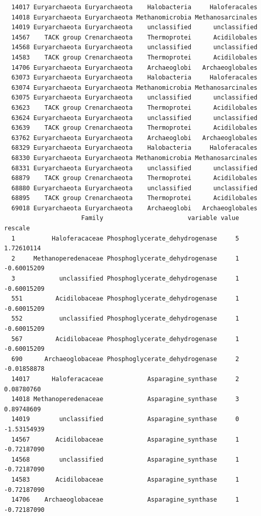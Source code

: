 \documentclass[12pt,twoside]{reedthesis}
\begin{document}
\begin{verbatim}
  14017 Euryarchaeota Euryarchaeota    Halobacteria     Haloferacales
  14018 Euryarchaeota Euryarchaeota Methanomicrobia Methanosarcinales
  14019 Euryarchaeota Euryarchaeota    unclassified      unclassified
  14567    TACK group Crenarchaeota    Thermoprotei      Acidilobales
  14568 Euryarchaeota Euryarchaeota    unclassified      unclassified
  14583    TACK group Crenarchaeota    Thermoprotei      Acidilobales
  14706 Euryarchaeota Euryarchaeota    Archaeoglobi   Archaeoglobales
  63073 Euryarchaeota Euryarchaeota    Halobacteria     Haloferacales
  63074 Euryarchaeota Euryarchaeota Methanomicrobia Methanosarcinales
  63075 Euryarchaeota Euryarchaeota    unclassified      unclassified
  63623    TACK group Crenarchaeota    Thermoprotei      Acidilobales
  63624 Euryarchaeota Euryarchaeota    unclassified      unclassified
  63639    TACK group Crenarchaeota    Thermoprotei      Acidilobales
  63762 Euryarchaeota Euryarchaeota    Archaeoglobi   Archaeoglobales
  68329 Euryarchaeota Euryarchaeota    Halobacteria     Haloferacales
  68330 Euryarchaeota Euryarchaeota Methanomicrobia Methanosarcinales
  68331 Euryarchaeota Euryarchaeota    unclassified      unclassified
  68879    TACK group Crenarchaeota    Thermoprotei      Acidilobales
  68880 Euryarchaeota Euryarchaeota    unclassified      unclassified
  68895    TACK group Crenarchaeota    Thermoprotei      Acidilobales
  69018 Euryarchaeota Euryarchaeota    Archaeoglobi   Archaeoglobales
                     Family                       variable value     rescale
  1          Haloferacaceae Phosphoglycerate_dehydrogenase     5  1.72610114
  2     Methanoperedenaceae Phosphoglycerate_dehydrogenase     1 -0.60015209
  3            unclassified Phosphoglycerate_dehydrogenase     1 -0.60015209
  551         Acidilobaceae Phosphoglycerate_dehydrogenase     1 -0.60015209
  552          unclassified Phosphoglycerate_dehydrogenase     1 -0.60015209
  567         Acidilobaceae Phosphoglycerate_dehydrogenase     1 -0.60015209
  690      Archaeoglobaceae Phosphoglycerate_dehydrogenase     2 -0.01858878
  14017      Haloferacaceae            Asparagine_synthase     2  0.08780760
  14018 Methanoperedenaceae            Asparagine_synthase     3  0.89748609
  14019        unclassified            Asparagine_synthase     0 -1.53154939
  14567       Acidilobaceae            Asparagine_synthase     1 -0.72187090
  14568        unclassified            Asparagine_synthase     1 -0.72187090
  14583       Acidilobaceae            Asparagine_synthase     1 -0.72187090
  14706    Archaeoglobaceae            Asparagine_synthase     1 -0.72187090

\end{verbatim}
\end{document}
